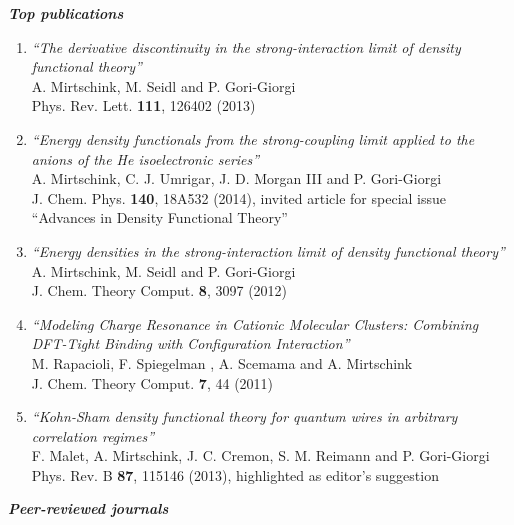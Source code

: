 \documentclass[line,margin]{res}
\begin{document}
\begin{resume}
\begin{tabular}{llllll}
					\end{tabular}


				\textit{\textbf{Top publications}}\smallskip

				\begin{enumerate}
				
				\item {\sl ``The derivative discontinuity in the strong-interaction limit of density functional theory''}\\
				A. Mirtschink, M. Seidl and P. Gori-Giorgi\\
				Phys. Rev. Lett. \textbf{111}, 126402 (2013)        

				\item {\sl ``Energy density functionals from the strong-coupling limit applied to the anions of the He isoelectronic series''}\\
				A. Mirtschink, C. J. Umrigar, J. D. Morgan III and P. Gori-Giorgi\\
				J. Chem. Phys. \textbf{140}, 18A532 (2014), invited article for special issue ``Advances in Density Functional Theory''

				\item {\sl ``Energy densities in the strong-interaction limit of density functional theory''}
					A. Mirtschink, M. Seidl and P. Gori-Giorgi\\
					J. Chem. Theory Comput. \textbf{8}, 3097 (2012)
					
				\item {\sl ``Modeling Charge Resonance in Cationic Molecular Clusters: Combining DFT-Tight Binding with Configuration Interaction''}\\
					M. Rapacioli, F. Spiegelman , A. Scemama and A. Mirtschink\\
					J. Chem. Theory Comput. \textbf{7}, 44 (2011)

				\item {\sl ``Kohn-Sham density functional theory for quantum wires in arbitrary correlation regimes''}\\
					F. Malet, A. Mirtschink, J. C. Cremon, S. M. Reimann and P. Gori-Giorgi\\
					Phys. Rev. B \textbf{87}, 115146 (2013), highlighted as editor's suggestion
					
               \end{enumerate}								

				\textit{\textbf{Peer-reviewed journals}}\smallskip

				\begin{etaremune}


\end{etaremune}
\end{resume}
\end{document}
